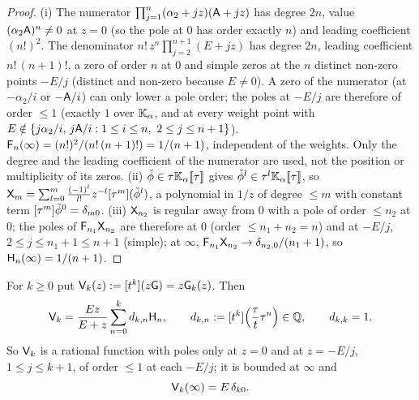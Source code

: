 \begin{proof}
(i) The numerator $\prod_{j=1}^{n}(\alpha_2+jz)(\mathsf{A}+jz)$ has degree $2n$, value $(\alpha_2\mathsf{A})^n\neq 0$ at $z = 0$ (so the pole at $0$ has order exactly $n$) and leading coefficient $(n!)^2$. The denominator $n!\,z^n\prod_{j=2}^{n+1}(E+jz)$ has degree $2n$, leading coefficient $n!\,(n+1)!$, a zero of order $n$ at $0$ and simple zeros at the $n$ distinct non-zero points $-E/j$ (distinct and non-zero because $E\neq 0$). A zero of the numerator (at $-\alpha_2/i$ or $-\mathsf{A}/i$) can only lower a pole order; the poles at $-E/j$ are therefore of order $\leq 1$ (exactly $1$ over $\mathbb{K}_{\alpha}$, and at every weight point with $E\notin\{j\alpha_2/i,\,j\mathsf{A}/i : 1\leq i\leq n,\ 2\leq j\leq n+1\}$). $\mathsf{F}_n(\infty) = (n!)^2/(n!\,(n+1)!) = 1/(n+1)$, independent of the weights. Only the degree and the leading coefficient of the numerator are used, not the position or multiplicity of its zeros.
(ii) $\breve{\phi}\in\tau\mathbb{K}_{\alpha}[\![ \tau ]\!]$ gives $\breve{\phi}^l\in\tau^l\mathbb{K}_{\alpha}[\![ \tau ]\!]$, so $\mathsf{X}_m = \sum_{l=0}^{m}\frac{(-1)^l}{l!}z^{-l}[\tau^m](\breve{\phi}^l)$, a polynomial in $1/z$ of degree $\leq m$ with constant term $[\tau^m]\breve{\phi}^0 = \delta_{m0}$.
(iii) $\mathsf{X}_{n_2}$ is regular away from $0$ with a pole of order $\leq n_2$ at $0$; the poles of $\mathsf{F}_{n_1}\mathsf{X}_{n_2}$ are therefore at $0$ (order $\leq n_1+n_2 = n$) and at $-E/j$, $2\leq j\leq n_1+1\leq n+1$ (simple); at $\infty$, $\mathsf{F}_{n_1}\mathsf{X}_{n_2}\to\delta_{n_2,0}/(n_1+1)$, so $\mathsf{H}_n(\infty) = 1/(n+1)$.
\end{proof}

\begin{lem}
\label{lem:lea-tcoef}
For $k\geq 0$ put $\mathsf{V}_k(z) := [t^k](z\mathsf{G}) = z\mathsf{G}_k(z)$. Then
\begin{equation}
\label{eq:lea-Rk}
\mathsf{V}_k = \frac{Ez}{E+z}\sum_{n=0}^{k}d_{k,n}\mathsf{H}_n,\qquad d_{k,n} := [t^k]\Bigl(\frac{\tau}{t}\tau^n\Bigr)\in\mathbb{Q},\qquad d_{k,k} = 1 .
\end{equation}
So $\mathsf{V}_k$ is a rational function with poles only at $z = 0$ and at $z = -E/j$, $1\leq j\leq k+1$, of order $\leq 1$ at each $-E/j$; it is bounded at $\infty$ and
\begin{equation}
\label{eq:lea-Rinf}
\mathsf{V}_k(\infty) = E\,\delta_{k0}.
\end{equation}
\end{lem}

